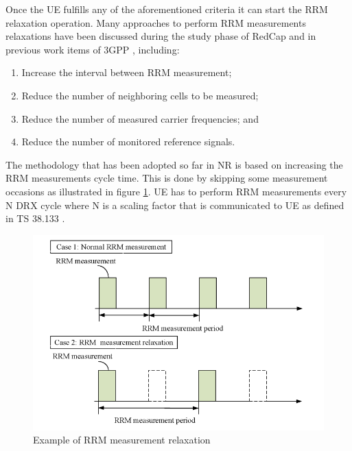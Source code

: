 \documentclass[]{IEEEtran}
\begin{document}
Once the UE fulfills any of the aforementioned criteria it can start the RRM relaxation operation. Many approaches to perform RRM measurements relaxations have been discussed during the study phase of RedCap and in previous work items of 3GPP \cite{3gpp_ue_2019_R2-1912335,3gpp_rrm_2019_R2-1912334,1912531_R2-1912531}, including:
\begin{enumerate}
    \item Increase the interval between RRM measurement;
    \item Reduce the number of neighboring cells to be measured;
    \item Reduce the number of measured carrier frequencies; and
    \item Reduce the number of monitored reference signals.
\end{enumerate}
The methodology that has been adopted so far in NR is based on increasing the RRM measurements cycle time. This is done by skipping some measurement occasions as illustrated in figure \ref{fig:rrm-relaxation}. UE has to perform RRM measurements every N DRX cycle where N is a scaling factor that is communicated to UE as defined in TS 38.133 \cite{3gpp_nr_2022-11_38.133}.

\begin{figure}
    \centering
    \includegraphics[width=\linewidth]{Pictures/RRM measurement relaxation.png}
    \caption{Example of RRM measurement relaxation}
    \label{fig:rrm-relaxation}
\end{figure}
\end{document}
